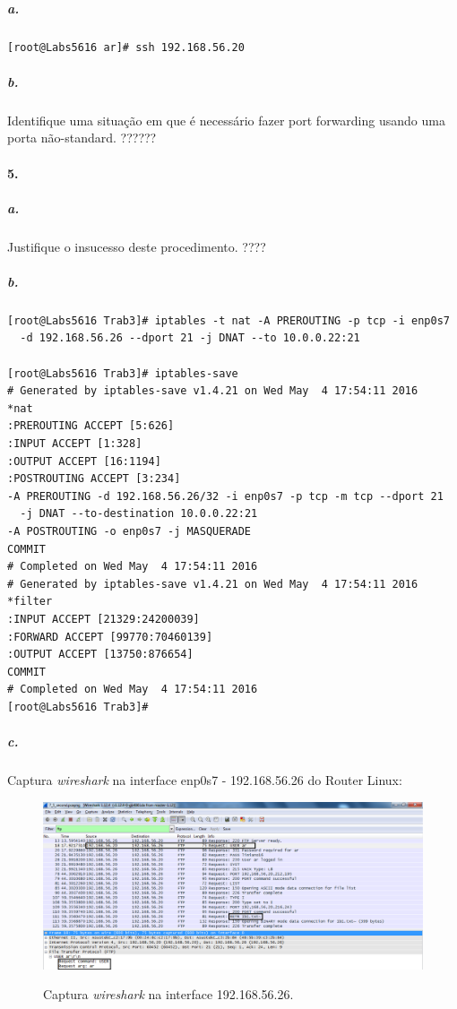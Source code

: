 \subparagraph{a.}
\begin{verbatim}
[root@Labs5616 ar]# ssh 192.168.56.20
\end{verbatim}


\subparagraph{b.}
Identifique uma situação em que é necessário fazer port forwarding usando uma porta não-standard. ??????


\paragraph{5.}

\subparagraph{a.}

Justifique o insucesso deste procedimento. ????


\subparagraph{b.}
\begin{verbatim}
[root@Labs5616 Trab3]# iptables -t nat -A PREROUTING -p tcp -i enp0s7 
  -d 192.168.56.26 --dport 21 -j DNAT --to 10.0.0.22:21

[root@Labs5616 Trab3]# iptables-save
# Generated by iptables-save v1.4.21 on Wed May  4 17:54:11 2016
*nat
:PREROUTING ACCEPT [5:626]
:INPUT ACCEPT [1:328]
:OUTPUT ACCEPT [16:1194]
:POSTROUTING ACCEPT [3:234]
-A PREROUTING -d 192.168.56.26/32 -i enp0s7 -p tcp -m tcp --dport 21 
  -j DNAT --to-destination 10.0.0.22:21
-A POSTROUTING -o enp0s7 -j MASQUERADE
COMMIT
# Completed on Wed May  4 17:54:11 2016
# Generated by iptables-save v1.4.21 on Wed May  4 17:54:11 2016
*filter
:INPUT ACCEPT [21329:24200039]
:FORWARD ACCEPT [99770:70460139]
:OUTPUT ACCEPT [13750:876654]
COMMIT
# Completed on Wed May  4 17:54:11 2016
[root@Labs5616 Trab3]# 
\end{verbatim}


\subparagraph{c.}
Captura \emph{wireshark} na interface \textsf{enp0s7 - 192.168.56.26} do \textsf{Router Linux}:

\begin{figure}[h]
\centering
\includegraphics[width=1\textwidth, height=0.3\textheight]{5_b-enp0s7.png}
\label{fig:enp0s7}
\caption{Captura \emph{wireshark} na interface \textsf{192.168.56.26}.}
\end{figure}

